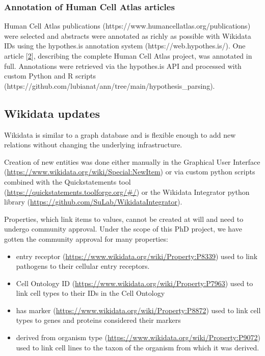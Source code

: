 \hypertarget{annotation-of-human-cell-atlas-articles}{%
\subsubsection{Annotation of Human Cell Atlas articles}\label{annotation-of-human-cell-atlas-articles}}

Human Cell Atlas publications (https://www.humancellatlas.org/publications) were selected and abstracts were annotated as richly as possible with Wikidata IDs using the hypothes.is annotation system (https://web.hypothes.is/). One article {[}\protect\hyperlink{ref-1GmbExweg}{2}{]}, describing the complete Human Cell Atlas project, was annotated in full. Annotations were retrieved via the hypothes.is API and processed with custom Python and R scripts (https://github.com/lubianat/ann/tree/main/hypothesis\_parsing).

\hypertarget{wikidata-updates}{%
\subsection{Wikidata updates}\label{wikidata-updates}}

Wikidata is similar to a graph database and is flexible enough to add new relations without changing the underlying infrastructure.

Creation of new entities was done either manually in the Graphical User Interface (\url{https://www.wikidata.org/wiki/Special:NewItem}) or via custom python scripts combined with the Quickstatements tool (\url{https://quickstatements.toolforge.org/\#/}) or the Wikidata Integrator python library (\url{https://github.com/SuLab/WikidataIntegrator}).

Properties, which link items to values, cannot be created at will and need to undergo community approval. Under the scope of this PhD project, we have gotten the community approval for many properties:

\begin{itemize}
\tightlist
\item
  entry receptor (\url{https://www.wikidata.org/wiki/Property:P8339}) used to link pathogens to their cellular entry receptors.
\item
  Cell Ontology ID (\url{https://www.wikidata.org/wiki/Property:P7963}) used to link cell types to their IDs in the Cell Ontology
\item
  has marker (\url{https://www.wikidata.org/wiki/Property:P8872}) used to link cell types to genes and proteins considered their markers
\item
  derived from organism type (\url{https://www.wikidata.org/wiki/Property:P9072}) used to link cell lines to the taxon of the organism from which it was derived.
\end{itemize}

